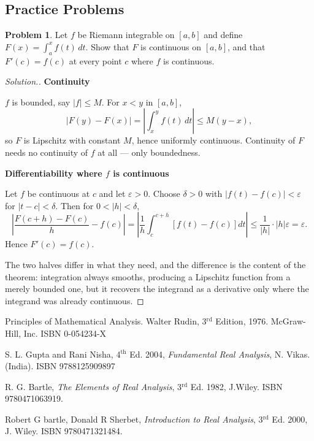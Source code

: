 \documentclass[11pt,a4paper]{article}
\numberwithin{equation}{section}
\theoremstyle{definition}
\newtheorem{problemx}{Problem}[subsection]
\newenvironment{problem}{\begin{problemx}}{\end{problemx}}
\newenvironment{solution}
  {\renewcommand{\qedsymbol}{}\begin{proof}[\textit{Solution}.]}
  {\end{proof}}
\newcommand{\subhead}[1]{%
  \par\medskip\noindent\textbf{#1}\par\nobreak\smallskip}
\begin{document}
\subsection{Practice Problems}

\begin{problem}
Let $f$ be Riemann integrable on $[a,b]$ and define
$F(x) = \int_a^{x} f(t)\,dt$. Show that $F$ is continuous on $[a,b]$, and that
$F'(c)=f(c)$ at every point $c$ where $f$ is continuous.
\end{problem}
\begin{solution}
\subhead{Continuity}
$f$ is bounded, say $|f|\leq M$. For $x<y$ in $[a,b]$,
$$|F(y)-F(x)| = \left|\int_x^{y}f(t)\,dt\right| \leq M(y-x),$$
so $F$ is Lipschitz with constant $M$, hence uniformly continuous. Continuity of
$F$ needs no continuity of $f$ at all --- only boundedness.

\subhead{Differentiability where $f$ is continuous}
Let $f$ be continuous at $c$ and let $\varepsilon>0$. Choose $\delta>0$ with
$|f(t)-f(c)|<\varepsilon$ for $|t-c|<\delta$. Then for
$0<|h|<\delta$,
$$\left|\frac{F(c+h)-F(c)}{h} - f(c)\right|
= \left|\frac{1}{h}\int_c^{c+h}[f(t)-f(c)]dt\right|
\leq \frac{1}{|h|}\cdot|h|\varepsilon = \varepsilon .$$
Hence $F'(c) = f(c)$.

The two halves differ in what they need, and the difference is the content of
the theorem: integration always smooths, producing a Lipschitz function from a
merely bounded one, but it recovers the integrand as a derivative only where the
integrand was already continuous.
\end{solution}


\pagebreak

\begin{thebibliography}{}
Principles of Mathematical Analysis. Walter Rudin, 3$^{\text{rd}}$ Edition, 1976. McGraw-Hill, Inc. ISBN 0-054234-X

S. L. Gupta and Rani Nisha, 4$^{\text{th}}$ Ed. 2004, \textit{Fundamental Real  Analysis}, N. Vikas.(India). ISBN 9788125909897

R. G. Bartle, \textit{The Elements of Real Analysis}, 3$^{\text{rd}}$ Ed. 1982, J.Wiley. ISBN 9780471063919.

Robert G bartle, Donald R Sherbet, \textit{Introduction to Real Analysis},  3$^{\text{rd}}$ Ed. 2000, J. Wiley. ISBN 9780471321484.
\end{thebibliography}
\end{document}
